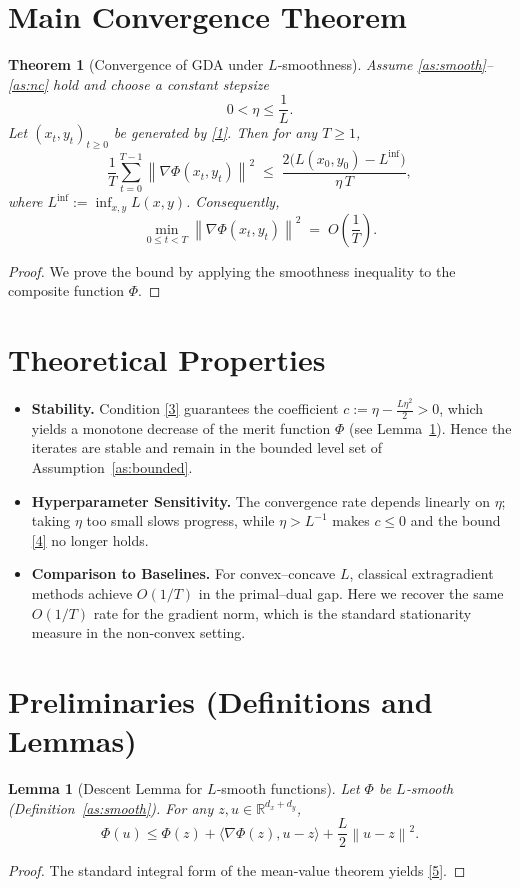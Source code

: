 \documentclass{article}
\newtheorem{theorem}{Theorem}
\newtheorem{lemma}{Lemma}
\newcommand{\norm}[1]{\left\lVert#1\right\rVert}
\begin{document}
\section*{Main Convergence Theorem}
\begin{theorem}[Convergence of GDA under $L$‑smoothness]\label{thm:main}
Assume \ref{as:smooth}–\ref{as:nc} hold and choose a constant stepsize
\[
0<\eta\le\frac{1}{L}. \tag{3}
\]
Let $(x_t,y_t)_{t\ge0}$ be generated by \eqref{1}. Then for any $T\ge1$,
\[
\frac{1}{T}\sum_{t=0}^{T-1}\norm{\nabla\Phi(x_t,y_t)}^{2}
\;\le\;
\frac{2\bigl(L(x_0,y_0)-L^{\inf}\bigr)}{\eta\,T},
\tag{4}
\]
where $L^{\inf}:=\inf_{x,y}L(x,y)$.
Consequently,
\[
\min_{0\le t<T}\norm{\nabla\Phi(x_t,y_t)}^{2}
\;=\;O\!\left(\frac{1}{T}\right).
\]
\end{theorem}
\begin{proof}
We prove the bound by applying the smoothness inequality to the composite function $\Phi$.
\end{proof}

\section*{Theoretical Properties}
\begin{itemize}
\item \textbf{Stability.} Condition \eqref{3} guarantees the coefficient $c:=\eta-\frac{L\eta^{2}}{2}>0$, which yields a monotone decrease of the merit function $\Phi$ (see Lemma~\ref{lem:descent}). Hence the iterates are stable and remain in the bounded level set of Assumption~\ref{as:bounded}.
\item \textbf{Hyperparameter Sensitivity.} The convergence rate depends linearly on $\eta$; taking $\eta$ too small slows progress, while $\eta>L^{-1}$ makes $c\le0$ and the bound \eqref{4} no longer holds.
\item \textbf{Comparison to Baselines.} For convex–concave $L$, classical extragradient methods achieve $O(1/T)$ in the primal–dual gap. Here we recover the same $O(1/T)$ rate for the gradient norm, which is the standard stationarity measure in the non‑convex setting.
\end{itemize}

\newpage
\section*{Preliminaries (Definitions and Lemmas)}
\begin{lemma}[Descent Lemma for $L$‑smooth functions]\label{lem:descent}
Let $\Phi$ be $L$‑smooth (Definition~\ref{as:smooth}). For any $z,u\in\mathbb{R}^{d_x+d_y}$,
\[
\Phi(u)\le\Phi(z)+\langle\nabla\Phi(z),u-z\rangle+\frac{L}{2}\norm{u-z}^{2}.
\tag{5}
\]
\end{lemma}
\begin{proof}
The standard integral form of the mean‑value theorem yields \eqref{5}. \qedhere
\end{proof}
\end{document}

